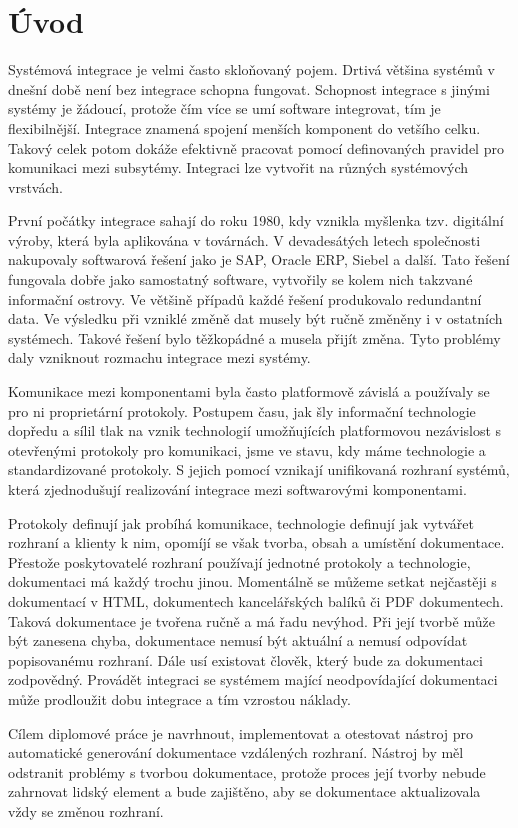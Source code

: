 \chapter{Úvod}
Systémová integrace je velmi často skloňovaný pojem. Drtivá většina systémů v dnešní době
není bez integrace schopna fungovat. Schopnost integrace s jinými systémy je žádoucí,
protože čím více se umí software integrovat, tím je flexibilnější. Integrace znamená spojení
menších komponent do vetšího celku. Takový celek potom dokáže efektivně pracovat pomocí
definovaných pravidel pro komunikaci mezi subsytémy. Integraci lze vytvořit na různých
systémových vrstvách.

První počátky integrace sahají do roku 1980, kdy vznikla myšlenka tzv. digitální výroby, která
byla aplikována v továrnách. V devadesátých letech společnosti nakupovaly softwarová řešení
jako je SAP, Oracle ERP, Siebel a další. Tato řešení fungovala dobře jako samostatný
software, vytvořily se kolem nich takzvané informační ostrovy. Ve většině případů každé
řešení produkovalo redundantní data. Ve výsledku při vzniklé změně dat musely být ručně
změněny i v ostatních systémech. Takové řešení bylo těžkopádné a musela přijít změna. Tyto
problémy daly vzniknout rozmachu integrace mezi systémy.

Komunikace mezi komponentami byla často platformově závislá a používaly se pro ni
proprietární protokoly. Postupem času, jak šly informační technologie dopředu a sílil tlak na
vznik technologií umožňujících platformovou nezávislost s otevřenými protokoly pro
komunikaci, jsme ve stavu, kdy máme technologie a standardizované protokoly. S jejich
pomocí vznikají unifikovaná rozhraní systémů, která zjednodušují realizování integrace mezi
softwarovými komponentami.

Protokoly definují jak probíhá komunikace, technologie definují jak vytvářet rozhraní a
klienty k nim, opomíjí se však tvorba, obsah a umístění dokumentace. Přestože poskytovatelé
rozhraní používají jednotné protokoly a technologie, dokumentaci má každý trochu jinou.
Momentálně se můžeme setkat nejčastěji s dokumentací v HTML, dokumentech
kancelářských balíků či PDF dokumentech. Taková dokumentace je tvořena ručně a má řadu
nevýhod. Při její tvorbě může být zanesena chyba, dokumentace nemusí být aktuální a nemusí
odpovídat popisovanému rozhraní. Dále usí existovat člověk, který bude za dokumentaci
zodpovědný. Provádět integraci se systémem mající neodpovídající dokumentaci může
prodloužit dobu integrace a tím vzrostou náklady.

Cílem diplomové práce je navrhnout, implementovat a otestovat nástroj pro automatické
generování dokumentace vzdálených rozhraní. Nástroj by měl odstranit problémy s tvorbou
dokumentace, protože proces její tvorby nebude zahrnovat lidský element a bude zajištěno,
aby se dokumentace aktualizovala vždy se změnou rozhraní. 


